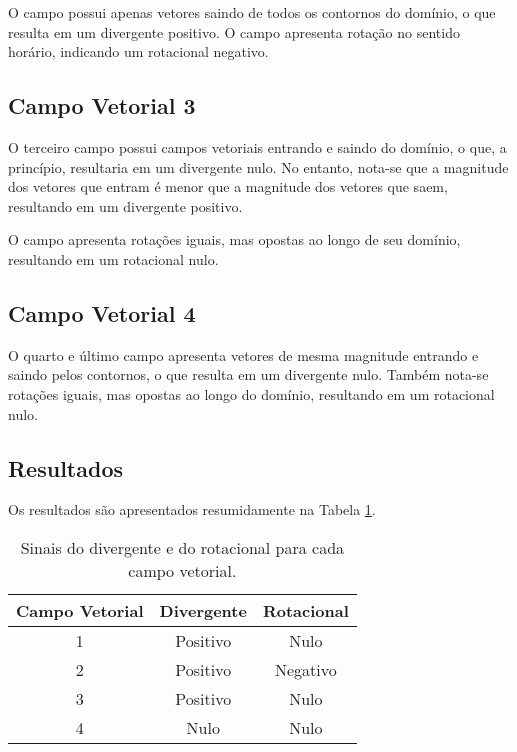 O campo possui apenas vetores saindo  de todos os contornos do dom\'inio, o que resulta em um divergente positivo. O campo apresenta rota\c{c}\~ao no sentido hor\'ario, indicando um rotacional negativo.

\subsection{Campo Vetorial 3} \label{sec:campo3}
O terceiro campo possui campos vetoriais entrando e saindo do dom\'inio, o que, a princ\'ipio, resultaria em um divergente nulo. No entanto, nota-se que a magnitude dos vetores que entram \'e menor que a magnitude dos vetores que saem, resultando em um divergente positivo. 

O campo apresenta rota\c{c}\~oes iguais, mas opostas ao longo de seu dom\'inio, resultando em um rotacional nulo.

\subsection{Campo Vetorial 4} \label{sec:campo4}
O quarto e \'ultimo campo apresenta vetores de mesma magnitude entrando e saindo pelos contornos, o que resulta em um divergente nulo. Tamb\'em nota-se rota\c{c}\~oes iguais, mas opostas ao longo do dom\'inio, resultando em um rotacional nulo.

\subsection{Resultados} \label{sec:res5}
Os resultados s\~ao apresentados resumidamente na Tabela \ref{tab:divrot}.
\begin{table}[h]
    \centering
    \caption{Sinais do divergente e do rotacional para cada campo vetorial.}
    \vskip 0.2cm
    \begin{tabular}{ccc}
        \hline
        \textbf{Campo Vetorial} & \textbf{Divergente} & \textbf{Rotacional} \\
        \hline
        1 & Positivo & Nulo \\
        2 & Positivo & Negativo \\
        3 & Positivo & Nulo \\
        4 & Nulo & Nulo \\
        \hline
    \end{tabular}
    \label{tab:divrot}
\end{table}